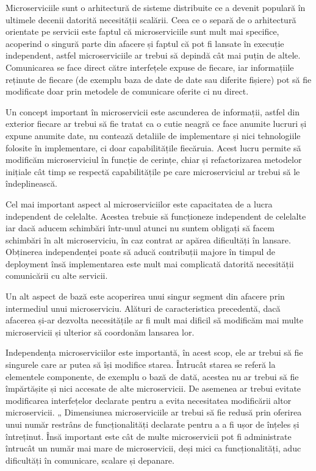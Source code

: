 Microserviciile sunt o arhitectură de sisteme distribuite ce a devenit populară în ultimele decenii datorită
necesității scalării. Ceea ce o separă de o arhitectură orientate pe servicii este faptul că microserviciile
sunt mult mai specifice, acoperind o singură parte din afacere și faptul că pot fi lansate în execuție independent,
astfel microserviciile ar trebui să depindă cât mai puțin de altele. Comunicarea se face direct către interfețele
expuse de fiecare, iar informațiile reținute de fiecare (de exemplu baza de date de date sau diferite fișiere)
pot să fie modificate doar prin metodele de comunicare oferite ci nu direct.

Un concept important în microservicii este ascunderea de informații, astfel din exterior fiecare ar trebui să 
fie tratat ca o cutie neagră ce face anumite lucruri și expune anumite date, nu contează detaliile de implementare
și nici tehnologiile folosite în implementare, ci doar capabilitățile fiecăruia. Acest lucru permite să modificăm
microserviciul în funcție de cerințe, chiar și refactorizarea metodelor inițiale cât timp se respectă 
capabilitățile pe care microserviciul ar trebui să le îndeplinească.

Cel mai important aspect al microserviciilor este capacitatea de a lucra independent de celelalte. Acestea
trebuie să funcționeze independent de celelalte iar dacă aducem schimbări într-unul atunci nu suntem obligați să
facem schimbări în alt microserviciu, în caz contrat ar apărea dificultăți în lansare. Obținerea independenței poate
să aducă contribuții majore în timpul de deployment însă implementarea este mult mai complicată datorită necesității
comunicării cu alte servicii.

Un alt aspect de bază este acoperirea unui singur segment din afacere prin intermediul unui microserviciu. Alături 
de caracteristica precedentă, dacă afacerea și-ar dezvolta necesitățile ar fi mult mai dificil să modificăm
mai multe microservicii și ulterior să coordonăm lansarea lor.

Independența microserviciilor este importantă, în acest scop, ele ar trebui să fie singurele care ar putea să își modifice starea.
Întrucât starea se referă la elementele componente, de exemplu o bază de dată, acestea nu ar trebui să fie împărtășite
și nici accesate de alte microservicii. De asemenea ar trebui evitate modificarea interfețelor declarate pentru
a evita necesitatea modificării altor microservicii.
„
Dimensiunea microserviciile ar trebui să fie redusă prin oferirea unui număr restrâns de funcționalități declarate pentru a
a fi ușor de înțeles și întreținut. Însă important este cât de multe microservicii
pot fi administrate întrucât un număr mai mare de microservicii, deși mici ca funcționalități, aduc dificultăți
în comunicare, scalare și depanare.

